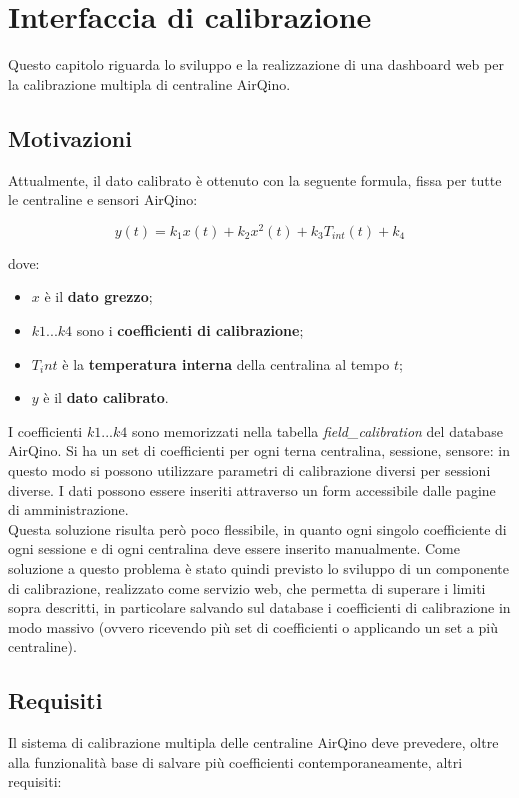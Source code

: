 \chapter{Interfaccia di calibrazione}\label{ch:interfaccia}
Questo capitolo riguarda lo sviluppo e la realizzazione di una dashboard web per la calibrazione multipla di centraline AirQino.

\section{Motivazioni}\label{sec:motivazioni}
Attualmente, il dato calibrato è ottenuto con la seguente formula, fissa per tutte le centraline e sensori AirQino:

$$y(t)=k_{1} x(t)+k_{2} x^{2}(t)+k_{3} T_{int}(t)+k_{4}$$\smallskip

dove:

\begin{itemize}
  \item $x$ è il \textbf{dato grezzo};
  \item $k1...k4$ sono i \textbf{coefficienti di calibrazione};
  \item $T_int$ è la \textbf{temperatura interna} della centralina al tempo $t$;
  \item $y$ è il \textbf{dato calibrato}.
\end{itemize}

I coefficienti $k1...k4$ sono memorizzati nella tabella \textit{field\_calibration} del database AirQino. Si ha
un set di coefficienti per ogni terna centralina, sessione, sensore: in questo modo si possono utilizzare parametri di calibrazione diversi per sessioni diverse. I dati possono essere inseriti attraverso un form accessibile dalle pagine di amministrazione.\\

Questa soluzione risulta però poco flessibile, in quanto ogni singolo coefficiente di ogni sessione e di ogni centralina deve essere inserito manualmente. Come soluzione a questo problema è stato quindi previsto lo sviluppo di un componente di calibrazione, realizzato come servizio web, che permetta di superare i limiti sopra descritti, in particolare salvando sul database i coefficienti di calibrazione in modo massivo (ovvero ricevendo più set di coefficienti o applicando un set a più centraline).

\section{Requisiti}\label{sec:requisiti}
Il sistema di calibrazione multipla delle centraline AirQino deve prevedere, oltre alla funzionalità base di salvare più coefficienti contemporaneamente, altri requisiti:

